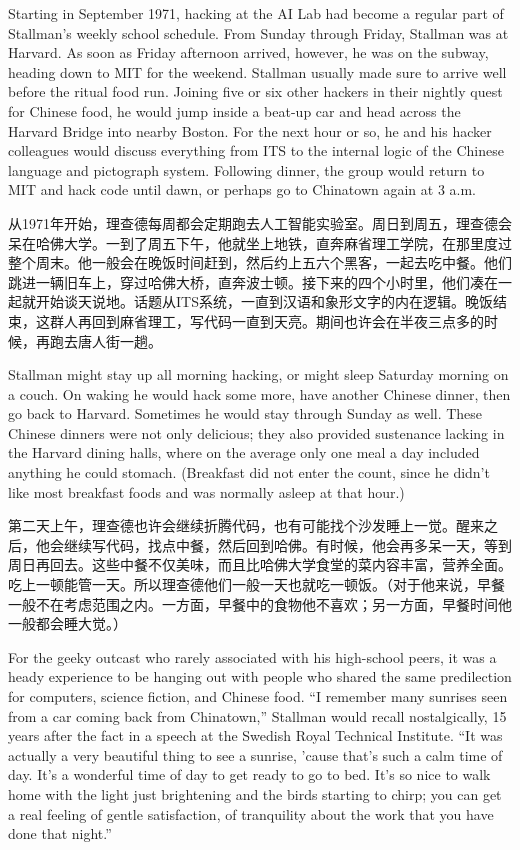\ifdefined\eng
Starting in September 1971, hacking at the AI Lab had become a regular part of Stallman's weekly school schedule. From Sunday through Friday, Stallman was at Harvard. As soon as Friday afternoon arrived, however, he was on the subway, heading down to MIT for the weekend. Stallman usually made sure to arrive well before the ritual food run. Joining five or six other hackers in their nightly quest for Chinese food, he would jump inside a beat-up car and head across the Harvard Bridge into nearby Boston. For the next hour or so, he and his hacker colleagues would discuss everything from ITS to the internal logic of the Chinese language and pictograph system. Following dinner, the group would return to MIT and hack code until dawn, or perhaps go to Chinatown again at 3 a.m.
\fi

\ifdefined\chs
从1971年开始，理查德每周都会定期跑去人工智能实验室。周日到周五，理查德会呆在哈佛大学。一到了周五下午，他就坐上地铁，直奔麻省理工学院，在那里度过整个周末。他一般会在晚饭时间赶到，然后约上五六个黑客，一起去吃中餐。他们跳进一辆旧车上，穿过哈佛大桥，直奔波士顿。接下来的四个小时里，他们凑在一起就开始谈天说地。话题从ITS系统，一直到汉语和象形文字的内在逻辑。晚饭结束，这群人再回到麻省理工，写代码一直到天亮。期间也许会在半夜三点多的时候，再跑去唐人街一趟。
\fi

\ifdefined\eng
Stallman might stay up all morning hacking, or might sleep Saturday morning on a couch. On waking he would hack some more, have another Chinese dinner, then go back to Harvard.  Sometimes he would stay through Sunday as well.  These Chinese dinners were not only delicious; they also provided sustenance lacking in the Harvard dining halls, where on the average only one meal a day included anything he could stomach. (Breakfast did not enter the count, since he didn't like most breakfast foods and was normally asleep at that hour.)
\fi

\ifdefined\chs
第二天上午，理查德也许会继续折腾代码，也有可能找个沙发睡上一觉。醒来之后，他会继续写代码，找点中餐，然后回到哈佛。有时候，他会再多呆一天，等到周日再回去。这些中餐不仅美味，而且比哈佛大学食堂的菜内容丰富，营养全面。吃上一顿能管一天。所以理查德他们一般一天也就吃一顿饭。（对于他来说，早餐一般不在考虑范围之内。一方面，早餐中的食物他不喜欢；另一方面，早餐时间他一般都会睡大觉。）
\fi

\ifdefined\eng
For the geeky outcast who rarely associated with his high-school peers, it was a heady experience to be hanging out with people who shared the same predilection for computers, science fiction, and Chinese food. ``I remember many sunrises seen from a car coming back from Chinatown,'' Stallman would recall nostalgically, 15 years after the fact in a speech at the Swedish Royal Technical Institute. ``It was actually a very beautiful thing to see a sunrise, 'cause that's such a calm time of day. It's a wonderful time of day to get ready to go to bed. It's so nice to walk home with the light just brightening and the birds starting to chirp; you can get a real feeling of gentle satisfaction, of tranquility about the work that you have done that night.''
\fi

